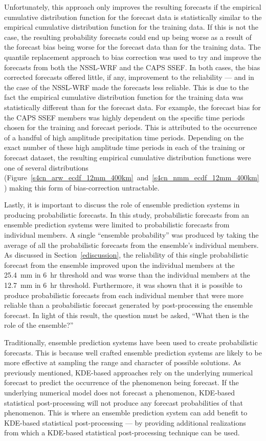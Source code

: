 Unfortunately, this approach only improves the resulting forecasts if the empirical cumulative distribution function for the forecast data is statistically similar to the empirical cumulative distribution function for the training data.
If this is not the case, the resulting probability forecasts could end up being worse as a result of the forecast bias being worse for the forecast data than for the training data.
The quantile replacement approach to bias correction was used to try and improve the forecasts from both the NSSL-WRF and the CAPS SSEF.
In both cases, the bias corrected forecasts offered little, if any, improvement to the reliability --- and in the case of the NSSL-WRF made the forecasts less reliable.
This is due to the fact the empirical cumulative distribution function for the training data was statistically different than for the forecast data.
For example, the forecast bias for the CAPS SSEF members was highly dependent on the specific time periods chosen for the training and forecast periods.
This is attributed to the occurrence of a handful of high amplitude precipitation time periods.
Depending on the exact number of these high amplitude time periods in each of the training or forecast dataset, the resulting empirical cumulative distribution functions were one of several distributions (\mbox{Figure \ref{s4cn_arw_ecdf_12mm_400km} and \ref{s4cn_nmm_ecdf_12mm_400km}}) making this form of bias-correction untractable.


Lastly, it is important to discuss the role of ensemble prediction systems in producing probabilistic forecasts.
In this study, probabilistic forecasts from an ensemble prediction systems were limited to probabilistic forecasts from individual members.
A single ``ensemble probability'' was produced by taking the average of all the probabilistic forecasts from the ensemble's individual members.
As discussed in \mbox{Section \ref{ediscussion}}, the reliability of this single probabilistic forecast from the ensemble improved upon the individual members at the \mbox{25.4 mm} in \mbox{6 hr} threshold and was worse than the individual members at the \mbox{12.7 mm} in \mbox{6 hr} threshold.
Furthermore, it was shown that it is possible to produce probabilistic forecasts from each individual member that were more reliable than a probabilistic forecast generated by post-processing the ensemble forecast.
In light of this result, the question must be asked, ``What then is the role of the ensemble?''


Traditionally, ensemble prediction systems have been used to create probabilistic forecasts.
This is because well crafted ensemble prediction systems are likely to be more effective at sampling the range and character of possible solutions.
As previously mentioned, KDE-based approaches rely on the underlying numerical forecast to predict the occurrence of the phenomenon being forecast.
If the underlying numerical model does not forecast a phenomenon, KDE-based statistical post-processing will not produce any forecast probabilities of that phenomenon.
This is where an ensemble prediction system can add benefit to KDE-based statistical post-processing --- by providing additional realizations from which a KDE-based statistical post-processing technique can be used.


